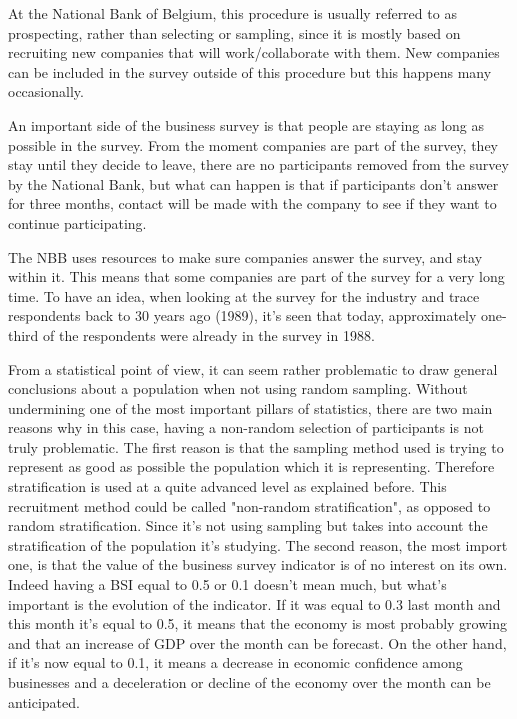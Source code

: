 \documentclass[12pt,a4paper,oneside]{book}
\begin{document}
At the National Bank of Belgium, this procedure is usually referred to as prospecting, rather than selecting or sampling, since it is mostly based on recruiting new companies that will work/collaborate with them. New companies can be included in the survey outside of this procedure but this happens many occasionally.


An important side of the business survey is that people are staying as long as possible in the survey.
From the moment companies are part of the survey, they stay until they decide to leave, there are no participants removed from the survey by the National Bank, but what can happen is that if participants don't answer for three months, contact will be made with the company to see if they want to continue participating.

The NBB uses resources to make sure companies answer the survey, and stay within it.
This means that some companies are part of the survey for a very long time.
To have an idea, when looking at the survey for the industry and trace respondents back to 30 years ago (1989), it's seen that today, approximately one-third of the respondents were already in the survey in 1988.

From a statistical point of view, it can seem rather problematic to draw general conclusions about a population when not using random sampling.
Without undermining one of the most important pillars of statistics, there are two main reasons why in this case, having a non-random selection of participants is not truly problematic.
The first reason is that the sampling method used is trying to represent as good as possible the population which it is representing. Therefore stratification is used at a quite advanced level as explained before. 
This recruitment method could be called "non-random stratification", as opposed to random stratification. Since it's not using sampling but takes into account the stratification of the population it's studying.
The second reason, the most import one, is that the value of the business survey indicator is of no interest on its own. Indeed having a BSI equal to 0.5 or 0.1 doesn't mean much, but what's important is the evolution of the indicator. If it was equal to 0.3 last month and this month it's equal to 0.5, it means that the economy is most probably growing and that an increase of GDP over the month can be forecast. On the other hand, if it's now equal to 0.1, it means a decrease in economic confidence among businesses and a deceleration or decline of the economy over the month can be anticipated.
\end{document}

